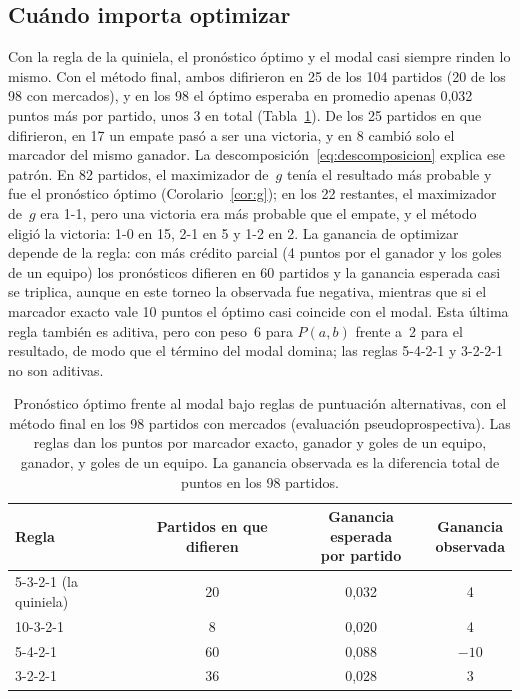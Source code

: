 \documentclass[12pt]{article}
\theoremstyle{plain}
\theoremstyle{remark}
\begin{document}
\FloatBarrier
\subsection{Cuándo importa optimizar}
\label{sec:reglas}

Con la regla de la quiniela, el pronóstico óptimo y el modal casi
siempre rinden lo mismo.
Con el método final, ambos difirieron en 25 de los 104 partidos (20 de
los 98 con mercados), y en los 98 el óptimo esperaba en promedio
apenas 0,032 puntos más por partido, unos 3 en total
(Tabla~\ref{tab:reglas-alt}).
De los 25 partidos en que difirieron, en 17 un empate pasó a ser una
victoria, y en 8 cambió solo el marcador del mismo ganador.
La descomposición~\eqref{eq:descomposicion} explica ese patrón.
En 82 partidos, el maximizador de~$g$ tenía el resultado más probable
y fue el pronóstico óptimo (Corolario~\ref{cor:g}); en los 22
restantes, el maximizador de~$g$ era 1-1, pero una victoria era más
probable que el empate, y el método eligió la victoria: 1-0 en 15,
2-1 en 5 y 1-2 en 2.
La ganancia de optimizar depende de la regla: con más crédito parcial
(4 puntos por el ganador y los goles de un equipo) los pronósticos
difieren en 60 partidos y la ganancia esperada casi se triplica,
aunque en este torneo la observada fue negativa, mientras que si el
marcador exacto vale 10 puntos el óptimo casi coincide con el modal.
Esta última regla también es aditiva, pero con peso~6 para $P(a,b)$
frente a~2 para el resultado, de modo que el término del modal
domina; las reglas 5-4-2-1 y 3-2-2-1 no son aditivas.

\begin{table}[!htb]
\centering
\caption{Pronóstico óptimo frente al modal bajo reglas de puntuación
alternativas, con el método final en los 98 partidos con mercados
(evaluación pseudoprospectiva).
Las reglas dan los puntos por marcador exacto, ganador y goles de un
equipo, ganador, y goles de un equipo. La ganancia observada es la
diferencia total de puntos en los 98 partidos.}
\label{tab:reglas-alt}
\begin{tabular}{lccc}
\toprule
Regla & Partidos en que difieren & \shortstack{Ganancia esperada\\por partido} & \shortstack{Ganancia\\observada} \\
\midrule
5-3-2-1 (la quiniela)  & 20 & 0,032 & 4 \\
10-3-2-1               &  8 & 0,020 & 4 \\
5-4-2-1                & 60 & 0,088 & $-10$ \\
3-2-2-1                & 36 & 0,028 & 3 \\
\bottomrule
\end{tabular}
\end{table}
\end{document}

